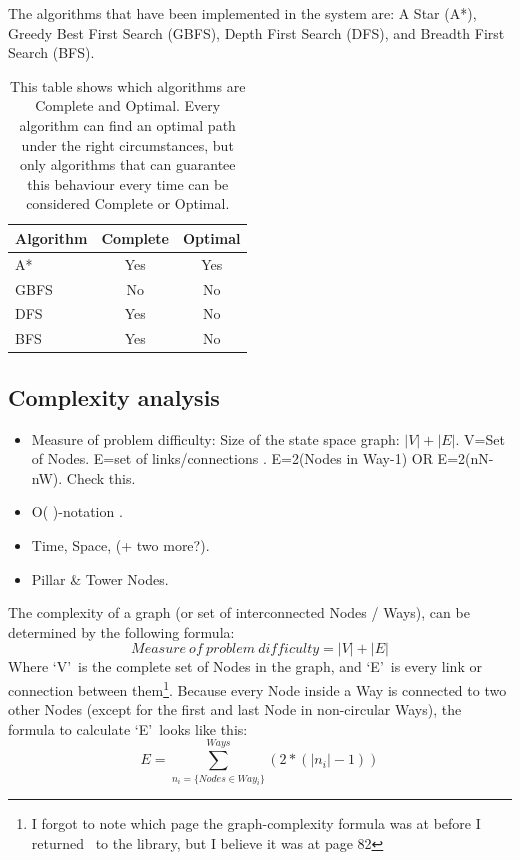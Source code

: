 The algorithms that have been implemented in the system are: A Star (A*), Greedy Best First Search (GBFS), Depth First Search (DFS), and Breadth First Search (BFS).

\begin{table}
	\begin{tabular}{| l | c | c |}
		\hline
		Algorithm & Complete & Optimal \\
		\hline
		A* & Yes & Yes  \\
		\hline
		GBFS & No & No \\
		\hline
		DFS & Yes & No \\
		\hline
		BFS & Yes & No \\
		\hline
	\end{tabular}
	\caption[Completeness and Optimality of implemented Search-algorithms]{This table shows which algorithms are Complete and Optimal. Every algorithm can find an optimal path under the right circumstances, but only algorithms that can guarantee this behaviour every time can be considered Complete or Optimal.}
	\label{tab:completeOptimal}
\end{table}

\subsection{Complexity analysis}\label{sec:complexityAnalysis}
\begin{itemize}
	\item Measure of problem difficulty: Size of the state space graph: $|V|+|E|$. V=Set of Nodes. E=set of links/connections \cite[Page: ?]{RN27}. E=2(Nodes in Way-1) OR E=2(nN-nW). Check this.
	\item O( )-notation \cite[P.82 \& P.1037]{RN27}.
	\item Time, Space, (+ two more?).
	\item Pillar \& Tower Nodes.
\end{itemize}

The complexity of a graph (or set of interconnected Nodes / Ways), can be determined by the following formula: $$Measure~of~problem~difficulty=|V|+|E|$$ Where \textquoteleft V\textquoteright~is the complete set of Nodes in the graph, and \textquoteleft E\textquoteright~is every link or connection between them\cite[p.82] {RN27}\footnote{I forgot to note which page the graph-complexity formula was at before I returned \cite{RN27}~to the library, but I believe it was at page 82}.
Because every Node inside a Way is connected to two other Nodes (except for the first and last Node in non-circular Ways), the formula to calculate \textquoteleft E\textquoteright~looks like this: $$E=\sum\limits_{n_i=\{Nodes\in Way_i\}}^{Ways}(2*(|n_i| - 1))$$

